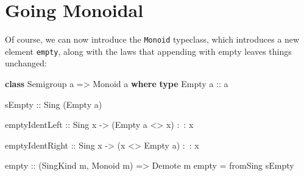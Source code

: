 \documentclass[]{article}
\newenvironment{Shaded}{\begin{snugshade}}{\end{snugshade}}
\newcommand{\DataTypeTok}[1]{\textcolor[rgb]{0.13,0.29,0.53}{#1}}
\newcommand{\FunctionTok}[1]{\textcolor[rgb]{0.00,0.00,0.00}{#1}}
\newcommand{\KeywordTok}[1]{\textcolor[rgb]{0.13,0.29,0.53}{\textbf{#1}}}
\newcommand{\NormalTok}[1]{#1}
\newcommand{\OtherTok}[1]{\textcolor[rgb]{0.56,0.35,0.01}{#1}}
\begin{document}
\begin{Shaded}
\end{Shaded}

\hypertarget{going-monoidal}{%
\section{Going Monoidal}\label{going-monoidal}}

Of course, we can now introduce the \texttt{Monoid} typeclass, which introduces
a new element \texttt{empty}, along with the laws that appending with empty
leaves things unchanged:

\begin{Shaded}
\begin{Highlighting}[]
\KeywordTok{class} \DataTypeTok{Semigroup}\NormalTok{ a }\OtherTok{=>} \DataTypeTok{Monoid}\NormalTok{ a }\KeywordTok{where}
    \KeywordTok{type} \DataTypeTok{Empty}\OtherTok{ a ::}\NormalTok{ a}

\OtherTok{    sEmpty ::} \DataTypeTok{Sing}\NormalTok{ (}\DataTypeTok{Empty}\NormalTok{ a)}

\NormalTok{    emptyIdentLeft}
\OtherTok{        ::} \DataTypeTok{Sing}\NormalTok{ x}
        \OtherTok{->}\NormalTok{ (}\DataTypeTok{Empty}\NormalTok{ a }\FunctionTok{<>}\NormalTok{ x) }\FunctionTok{:~:}\NormalTok{ x}

\NormalTok{    emptyIdentRight}
\OtherTok{        ::} \DataTypeTok{Sing}\NormalTok{ x}
        \OtherTok{->}\NormalTok{ (x }\FunctionTok{<>} \DataTypeTok{Empty}\NormalTok{ a) }\FunctionTok{:~:}\NormalTok{ x}

\NormalTok{empty}
\OtherTok{    ::}\NormalTok{ (}\DataTypeTok{SingKind}\NormalTok{ m, }\DataTypeTok{Monoid}\NormalTok{ m)}
    \OtherTok{=>} \DataTypeTok{Demote}\NormalTok{ m}
\NormalTok{empty }\FunctionTok{=}\NormalTok{ fromSing sEmpty}
\end{Highlighting}
\end{Shaded}
\end{document}
